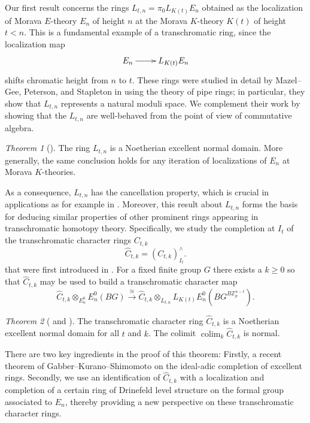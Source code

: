 \documentclass[oneside]{amsart}
\newcommand{\lra}[1]{\overset{#1}{\longrightarrow}}
\theoremstyle{definition}
\theoremstyle{remark}
\theoremstyle{theorem}
\newtheorem*{thm*}{Theorem}
\numberwithin{equation}{section}
\DeclareMathOperator{\colim}{colim}
\newcommand{\Z}{\mathbb{Z}}
\begin{document}
Our first result concerns the rings $L_{t,n}=\pi_0L_{K(t)}E_n$ obtained as the localization of Morava $E$-theory $E_n$ of height $n$ at the Morava $K$-theory $K(t)$ of height $t<n$. This is a fundamental example of a transchromatic ring, since the localization map
\[
\xymatrix{E_n \ar[r] & L_{K(t)}E_n}
\]
shifts chromatic height from $n$ to $t$. These rings were studied in detail by Mazel--Gee, Peterson, and Stapleton in \cite{piperings} using the theory of pipe rings;  in particular, they show that $L_{t,n}$ represents a natural moduli space. We complement their work by showing that the $L_{t,n}$ are well-behaved from the point of view of commutative algebra. 

\begin{thm*}[]
The ring $L_{t,n}$ is a Noetherian excellent normal domain. More generally, the same conclusion holds for any iteration of localizations of $E_n$ at Morava $K$-theories. 
\end{thm*}

As a consequence, $L_{t,n}$ has the cancellation property, which is crucial in applications as for example in \cite{bs_bpetheory}. Moreover, this result about $L_{t,n}$ forms the basis for deducing similar properties of other prominent rings appearing in transchromatic homotopy theory. Specifically, we study the completion at $I_t$ of the transchromatic character rings $C_{t,k}$ 
\[
\hat{C}_{t,k} = (C_{t,k})^{\wedge}_{I_t}.
\]
that were first introduced in \cite{stapleton_tgcm}. For a fixed finite group $G$ there exists a $k \geq 0$ so that $\hat{C}_{t,k}$ may be used to build a transchromatic character map
\[
\hat{C}_{t,k} \otimes_{E_{n}^0} E_{n}^0(BG) \lra{\cong} \hat{C}_{t,k} \otimes_{L_{t,n}} L_{K(t)}E_{n}^{0}(BG^{B\Z_{p}^{n-t}}).
\]

\begin{thm*}[ and ]
The transchromatic character ring $\hat{C}_{t,k}$ is a Noetherian excellent normal domain for all $t$ and $k$. The colimit $\colim_k \hat{C}_{t,k}$ is normal.
\end{thm*}

There are two key ingredients in the proof of this theorem: Firstly, a recent theorem of Gabber--Kurano--Shimomoto on the ideal-adic completion of excellent rings. Secondly, we use an identification of $\hat{C}_{t,k}$ with a localization and completion of a certain ring of Drinefeld level structure on the formal group associated to $E_n$, thereby providing a new perspective on these transchromatic character rings. 
\end{document}
